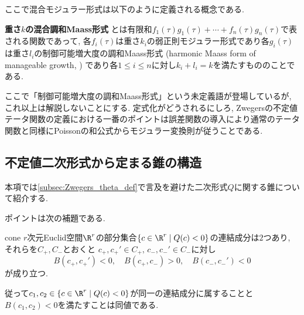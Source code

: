 \documentclass[11pt,b5paper,oneside,lualatex]{ltjsarticle} %
\numberwithin{equation}{section} %
\begin{document}
ここで混合モジュラー形式は以下のように定義される概念である. 

\begin{dfn}{{\cite[Definition 13.1]{BFOR}}}{}
	\textbf{重さ$ k $の混合調和Maass形式}%
	とは有限和$ f_1(\tau) g_1(\tau) + \cdots + f_n(\tau) g_n(\tau) $で表される関数であって, 各$ f_i(\tau) $は重さ$ k_i $の弱正則モジュラー形式であり各$ g_i(\tau) $は重さ$ l_i $の制御可能増大度の調和Maass形式 (harmonic Maass form of manageable growth, \cite[Definition 4.1]{BFOR}) であり各$ 1 \le i \le n $に対し$ k_i + l_i = k $を満たすもののことである. 
\end{dfn}

ここで「制御可能増大度の調和Maass形式」という未定義語が登場しているが, これ以上は解説しないことにする. 
定式化がどうされるにしろ, Zwegersの不定値テータ関数の定義における一番のポイントは誤差関数の導入により通常のテータ関数と同様にPoissonの和公式からモジュラー変換則が従うことである. 



\subsection{不定値二次形式から定まる錐の構造} \label{subsec:cone}


本項では\cref{subsec:Zwegers_theta_def}で言及を避けた二次形式$ Q $に関する錐について紹介する. 

ポイントは次の補題である. 

\begin{lem}{}{cone}
	$ r $次元Euclid空間$ \R^r $の部分集合$ \{ c \in \R^r \mid Q(c) < 0 \} $の連結成分は$ 2 $つあり, それらを$ C_+, C_- $とおくと
	$ c_+, c_+' \in C_+, \, c_-, c_-' \in C_- $に対し
	\[
	B(c_+, c_+') < 0, \quad
	B(c_+, c_-) > 0, \quad
	B(c_-, c_-') < 0
	\]
	が成り立つ. 
	
	従って$ c_1, c_2 \in \{ c \in \R^r \mid Q(c) < 0 \} $が同一の連結成分に属することと$ B(c_1, c_2) < 0 $を満たすことは同値である. 
\end{lem}
\end{document}
